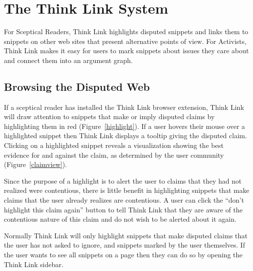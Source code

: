 \documentclass{chi2009}
\begin{document}
% 

% 

\section{The Think Link System}

For Sceptical Readers, Think Link highlights disputed snippets and links them to snippets on other web sites that present alternative points of view. For Activists, Think Link makes it easy for users to mark snippets about issues they care about and connect them into an argument graph.

\subsection{Browsing the Disputed Web}

If a sceptical reader has installed the Think Link browser extension, Think Link will draw attention to snippets that make or imply disputed claims by highlighting them in red (Figure~\ref{highlight}). If a user hovers their mouse over a highlighted snippet then Think Link displays a tooltip giving the disputed claim. Clicking on a highlighted snippet reveals a visualization showing the best evidence for and against the claim, as determined by the user community (Figure~\ref{claimview}).

Since the purpose of a highlight is to alert the user to claims that they had not realized were contentious, there is little benefit in highlighting snippets that make claims that the user already realizes are contentious. A user can click the ``don't highlight this claim again'' button to tell Think Link that they are aware of the contentious nature of this claim and do not wish to be alerted about it again.

Normally Think Link will only highlight snippets that make disputed claims that the user has not asked to ignore, and snippets marked by the user themselves. If the user wants to see all snippets on a page then they can do so by opening the Think Link sidebar. 
\end{document}
